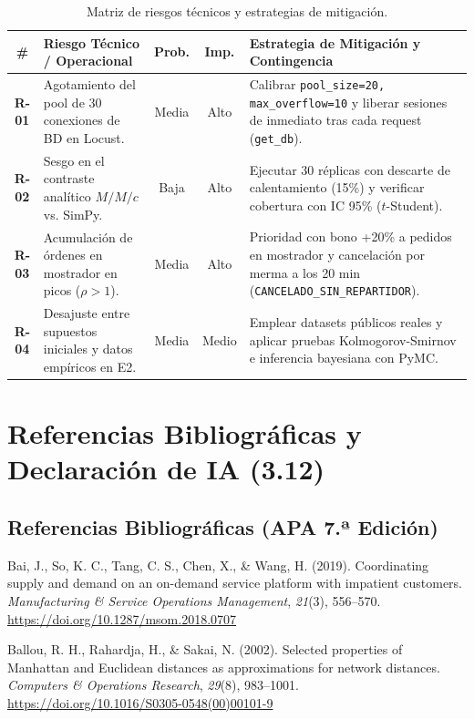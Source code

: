 \documentclass[11pt,letterpaper]{article}
\begin{document}
\begin{table}[htbp]
\centering
\small
\caption{Matriz de riesgos técnicos y estrategias de mitigación.}
\begin{tabularx}{\textwidth}{c p{4.2cm} c c X}
\toprule
\textbf{\#} & \textbf{Riesgo Técnico / Operacional} & \textbf{Prob.} & \textbf{Imp.} & \textbf{Estrategia de Mitigación y Contingencia} \\
\midrule
\textbf{R-01} & Agotamiento del pool de 30 conexiones de BD en Locust. & Media & Alto & Calibrar \texttt{pool\_size=20, max\_overflow=10} y liberar sesiones de inmediato tras cada request (\texttt{get\_db}). \\
\textbf{R-02} & Sesgo en el contraste analítico $M/M/c$ vs. SimPy. & Baja & Alto & Ejecutar 30 réplicas con descarte de calentamiento (15\%) y verificar cobertura con IC 95\% ($t$-Student). \\
\textbf{R-03} & Acumulación de órdenes en mostrador en picos ($\rho > 1$). & Media & Alto & Prioridad con bono +20\% a pedidos en mostrador y cancelación por merma a los 20 min (\texttt{CANCELADO\_SIN\_REPARTIDOR}). \\
\textbf{R-04} & Desajuste entre supuestos iniciales y datos empíricos en E2. & Media & Medio & Emplear datasets públicos reales y aplicar pruebas Kolmogorov-Smirnov e inferencia bayesiana con PyMC. \\
\bottomrule
\end{tabularx}
\end{table}

\section{Referencias Bibliográficas y Declaración de IA (3.12)}

\subsection{Referencias Bibliográficas (APA 7.ª Edición)}
\noindent Bai, J., So, K. C., Tang, C. S., Chen, X., \& Wang, H. (2019). Coordinating supply and demand on an on-demand service platform with impatient customers. \textit{Manufacturing \& Service Operations Management}, \textit{21}(3), 556–570. \url{https://doi.org/10.1287/msom.2018.0707}

\vspace{0.3em}
\noindent Ballou, R. H., Rahardja, H., \& Sakai, N. (2002). Selected properties of Manhattan and Euclidean distances as approximations for network distances. \textit{Computers \& Operations Research}, \textit{29}(8), 983–1001. \url{https://doi.org/10.1016/S0305-0548(00)00101-9}
\end{document}
